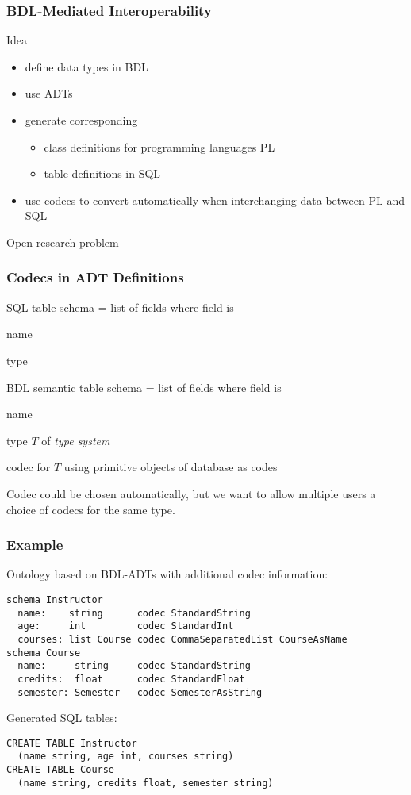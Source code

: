 \begin{frame}\frametitle{BDL-Mediated Interoperability}
Idea
 \begin{itemize}
 \item define data types in BDL 
 \item use ADTs
 \item generate corresponding
  \begin{itemize}
  \item class definitions for programming languages PL
  \item table definitions in SQL
  \end{itemize}
 \item use codecs to convert automatically when interchanging data between PL and SQL
 \end{itemize}

Open research problem
\end{frame}

\begin{frame}\frametitle{Codecs in ADT Definitions}
\begin{blockitems}{SQL table schema = list of fields where field is}
\item name
\item type 
\end{blockitems}

\begin{blockitems}{BDL semantic table schema = list of fields where field is}
\item name
\item type $T$ of \emph{type system} 
\item codec for $T$ using primitive objects of database as codes
\end{blockitems}

Codec could be chosen automatically, but we want to allow multiple users a choice of codecs for the same type.
\end{frame}

\begin{frame}[fragile]\frametitle{Example}
Ontology based on BDL-ADTs with additional codec information:
\begin{lstlisting}[basicstyle=\footnotesize]
schema Instructor
  name:    string      codec StandardString
  age:     int         codec StandardInt
  courses: list Course codec CommaSeparatedList CourseAsName
schema Course
  name:     string     codec StandardString
  credits:  float      codec StandardFloat
  semester: Semester   codec SemesterAsString
\end{lstlisting}
\medskip

Generated SQL tables:
\begin{lstlisting}[basicstyle=\footnotesize]
CREATE TABLE Instructor
  (name string, age int, courses string)
CREATE TABLE Course
  (name string, credits float, semester string)
\end{lstlisting}
\end{frame}

